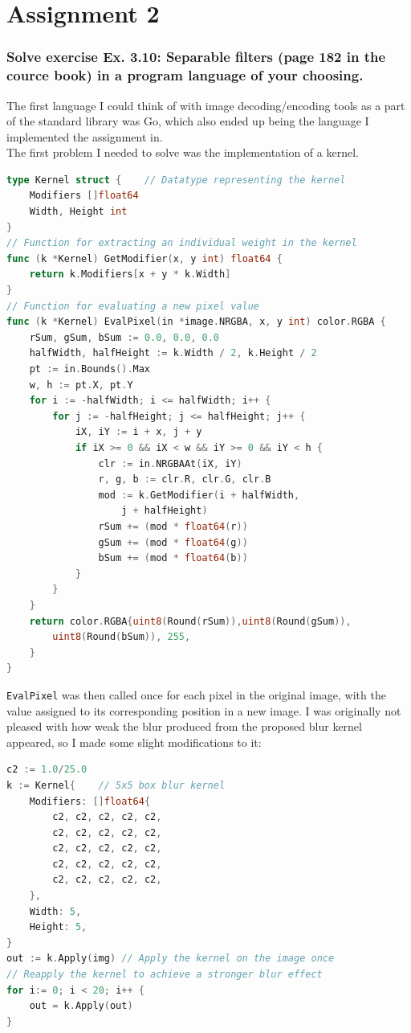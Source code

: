 \documentclass[a4paper, titlepage,12pt]{article}
\begin{document}
\section*{Assignment 2}

\subsubsection*{Solve exercise Ex. 3.10: Separable filters (page 182 in the cource book) in a program language of your choosing.}

The first language I could think of with image decoding/encoding tools as a part of the standard library was Go, which also ended up being the language I implemented the assignment in.\\

The first problem I needed to solve was the implementation of a kernel.

\begin{lstlisting}[language=Go]
type Kernel struct {	// Datatype representing the kernel
	Modifiers []float64
	Width, Height int
}
// Function for extracting an individual weight in the kernel
func (k *Kernel) GetModifier(x, y int) float64 {
	return k.Modifiers[x + y * k.Width]
}
// Function for evaluating a new pixel value
func (k *Kernel) EvalPixel(in *image.NRGBA, x, y int) color.RGBA {
	rSum, gSum, bSum := 0.0, 0.0, 0.0
	halfWidth, halfHeight := k.Width / 2, k.Height / 2
	pt := in.Bounds().Max
	w, h := pt.X, pt.Y
	for i := -halfWidth; i <= halfWidth; i++ {
		for j := -halfHeight; j <= halfHeight; j++ {
			iX, iY := i + x, j + y
			if iX >= 0 && iX < w && iY >= 0 && iY < h {
				clr := in.NRGBAAt(iX, iY)
				r, g, b := clr.R, clr.G, clr.B
				mod := k.GetModifier(i + halfWidth,
					j + halfHeight)
				rSum += (mod * float64(r))
				gSum += (mod * float64(g))
				bSum += (mod * float64(b))
			}
		}
	}
	return color.RGBA{uint8(Round(rSum)),uint8(Round(gSum)),
		uint8(Round(bSum)), 255,
	}
}
\end{lstlisting}

\lstinline{EvalPixel} was then called once for each pixel in the original image, with the value assigned to its corresponding position in a new image. I was originally not pleased with how weak the blur produced from the proposed blur kernel appeared, so I made some slight modifications to it:

\begin{lstlisting}[language=Go]
c2 := 1.0/25.0
k := Kernel{	// 5x5 box blur kernel
	Modifiers: []float64{
		c2, c2, c2, c2, c2,
		c2, c2, c2, c2, c2,
		c2, c2, c2, c2, c2,
		c2, c2, c2, c2, c2,
		c2, c2, c2, c2, c2,
	},
	Width: 5,
	Height: 5,
}
out := k.Apply(img)	// Apply the kernel on the image once
// Reapply the kernel to achieve a stronger blur effect
for i:= 0; i < 20; i++ {
	out = k.Apply(out)
}
\end{lstlisting}
\end{document}

